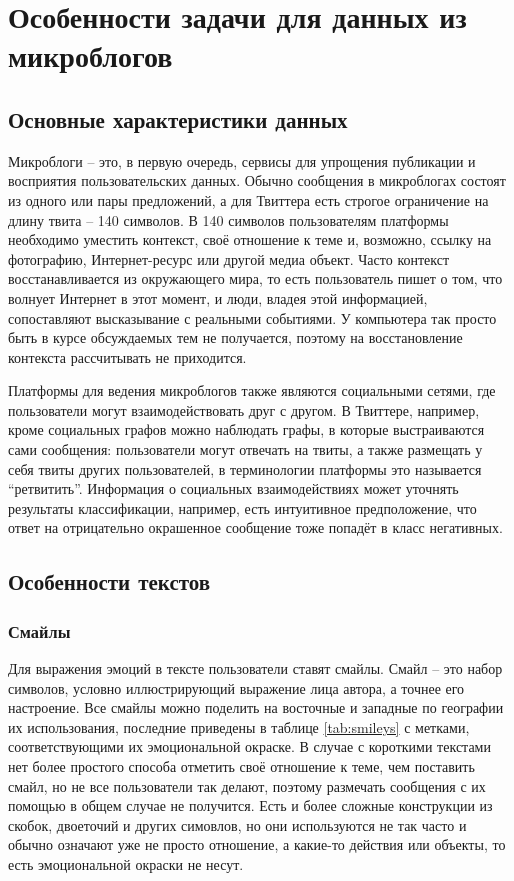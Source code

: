 \section{Особенности задачи для данных из микроблогов}
\subsection{Основные характеристики данных}
Микроблоги -- это, в первую очередь, сервисы для упрощения публикации и восприятия пользовательских
данных. Обычно сообщения в микроблогах состоят из одного или пары предложений, а для Твиттера есть
строгое ограничение на длину твита -- 140 символов. В 140 символов пользователям платформы необходимо
уместить контекст, своё отношение к теме и, возможно, ссылку на фотографию, Интернет-ресурс или
другой медиа объект. Часто контекст восстанавливается из окружающего мира, то есть пользователь
пишет о том, что волнует Интернет в этот момент, и люди, владея этой информацией, сопоставляют
высказывание с реальными событиями. У компьютера так просто быть в курсе обсуждаемых тем не
получается, поэтому на восстановление контекста рассчитывать не приходится.

Платформы для ведения микроблогов также являются социальными сетями, где пользователи могут
взаимодействовать друг с другом. В Твиттере, например, кроме социальных графов можно наблюдать
графы, в которые выстраиваются сами сообщения: пользователи могут отвечать на твиты, а также
размещать у себя твиты других пользователей, в терминологии платформы это называется
``ретвитить''. Информация о социальных взаимодействиях может уточнять результаты классификации,
например, есть интуитивное предположение, что ответ на отрицательно окрашенное сообщение тоже
попадёт в класс негативных.

\subsection{Особенности текстов}
\subsubsection{Смайлы}
Для выражения эмоций в тексте пользователи ставят смайлы. Смайл -- это набор символов, условно
иллюстрирующий выражение лица автора, а точнее его настроение. Все смайлы можно поделить на
восточные и западные по географии их использования, последние приведены в таблице \ref{tab:smileys}
с метками, соответствующими их эмоциональной окраске. В случае с короткими текстами нет более
простого способа отметить своё отношение к теме, чем поставить смайл, но не все пользователи так
делают, поэтому размечать сообщения с их помощью в общем случае не получится. Есть и более сложные
конструкции из скобок, двоеточий и других симовлов, но они используются не так часто и обычно
означают уже не просто отношение, а какие-то действия или объекты, то есть эмоциональной окраски не
несут.

